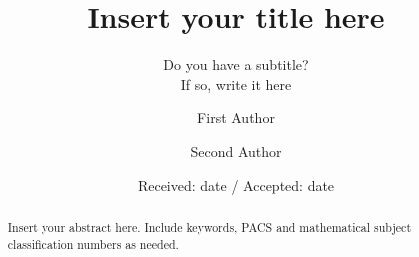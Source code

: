 
\title{Insert your title here%
}
\subtitle{Do you have a subtitle?\\ If so, write it here}


\author{
    First Author \and
    Second Author %
}



\date{Received: date / Accepted: date}

\maketitle

\begin{abstract}
    Insert your abstract here.
    Include keywords, PACS and mathematical subject classification numbers as needed.
\end{abstract}
